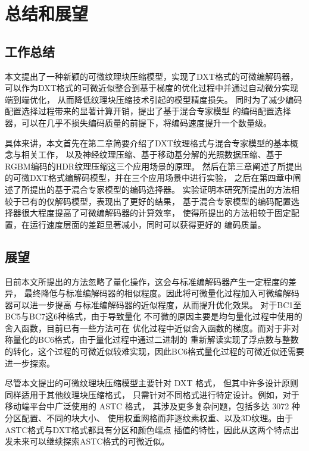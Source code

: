 
\chapter{总结和展望}

\section{工作总结}

本文提出了一种新颖的可微纹理块压缩模型，实现了DXT格式的可微编解码器，
可以作为DXT格式的可微近似整合到基于梯度的优化过程中并通过自动微分实现端到端优化，
从而降低纹理块压缩技术引起的模型精度损失。
同时为了减少编码配置选择过程带来的显著计算开销，提出了基于混合专家模型
的编码配置选择器，可以在几乎不损失编码质量的前提下，将编码速度提升一个数量级。

具体来讲，本文首先在第二章简要介绍了DXT纹理格式与混合专家模型的基本概念与相关工作，
以及神经纹理压缩、基于移动基分解的光照数据压缩、基于RGBM编码的HDR纹理压缩这三个应用场景的原理。
然后在第三章阐述了所提出的可微DXT格式编解码模型，并在三个应用场景中进行实验，
之后在第四章中阐述了所提出的基于混合专家模型的编码选择器。
实验证明本研究所提出的方法相较于已有的仅解码模型，表现出了更好的结果，
基于混合专家模型的编码配置选择器很大程度提高了可微编解码器的计算效率，
使得所提出的方法相较于固定配置，在运行速度层面的差距显著减小，同时可以获得更好的
编码质量。

\section{展望}

目前本文所提出的方法忽略了量化操作，这会与标准编解码器产生一定程度的差异，
最终降低与标准编解码器的相似程度。因此将可微量化过程加入可微编解码器可以进一步提高
与标准编解码器的近似程度，从而提升优化效果。
对于BC1至BC5与BC7这6种格式，由于导致量化
不可微的原因主要是均匀量化过程中使用的舍入函数，目前已有一些方法可在
优化过程中近似舍入函数的梯度。而对于非对称量化的BC6格式，由于量化过程中通过二进制的
重新解读实现了浮点数与整数的转化，这个过程的可微近似较难实现，因此BC6格式量化过程的可微近似还需要进一步探索。

尽管本文提出的可微纹理块压缩模型主要针对 DXT 格式，
但其中许多设计原则同样适用于其他纹理块压缩格式，
只需针对不同格式进行特定设计。例如，对于移动端平台中广泛使用的 ASTC 格式，
其涉及更多复杂问题，包括多达 3072 种分区配置、不同的块大小、
使用权重网格而非逐纹素权重、以及3D纹理。由于ASTC格式与DXT格式都具有分区和颜色端点
插值的特性，因此从这两个特点出发未来可以继续探索ASTC格式的可微近似。


